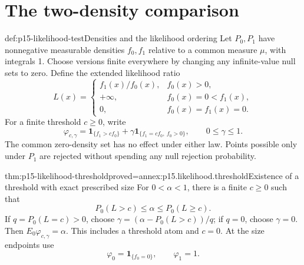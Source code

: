 \section{The two-density comparison}

\begin{hbdefinition}{def:p15-likelihood-test}{Densities and the likelihood ordering}
Let \(P_0,P_1\) have nonnegative measurable densities \(f_0,f_1\)
relative to a common measure \(\mu\), with integrals 1.
Choose versions finite everywhere by changing any infinite-value
null sets to zero. Define the extended likelihood ratio
\[
 L(x)=
 \begin{cases}
 f_1(x)/f_0(x),&f_0(x)>0,\\
 +\infty,&f_0(x)=0<f_1(x),\\
 0,&f_0(x)=f_1(x)=0.
 \end{cases}
\]
For a finite threshold \(c\geq0\), write
\[
 \varphi_{c,\gamma}
   =\mathbf1_{\{f_1>cf_0\}}
        +\gamma\mathbf1_{\{f_1=cf_0,\ f_0>0\}},
                         \qquad0\leq\gamma\leq1.
\]
The common zero-density set has no effect under either law.
Points possible only under \(P_1\) are rejected without
spending any null rejection probability.
\end{hbdefinition}

\begin{hblemma}{thm:p15-likelihood-threshold}{proved=annex:p15.likelihood.threshold}{Existence of a threshold with exact prescribed size}
For \(0<\alpha<1\), there is a finite \(c\geq0\) such that
\[
                      P_0(L>c)\leq\alpha\leq P_0(L\geq c).
\]
If \(q=P_0(L=c)>0\), choose
\(\gamma=(\alpha-P_0(L>c))/q\); if \(q=0\), choose
\(\gamma=0\). Then \(E_0\varphi_{c,\gamma}=\alpha\).
This includes a threshold atom and \(c=0\).
At the size endpoints use
\[
                  \varphi_0=\mathbf1_{\{f_0=0\}},\qquad
                  \varphi_1=1.
\]
\end{hblemma}

